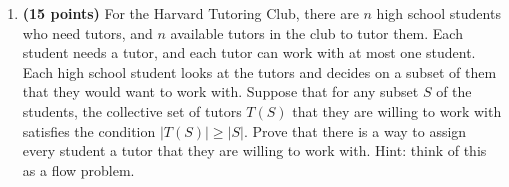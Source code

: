 \documentclass[11pt]{article}
\begin{document}
\begin{enumerate}
\item
{\bf (15 points)}
For the Harvard Tutoring Club, there are $n$ high school students who need tutors,
and $n$ available tutors in the club to tutor them.  Each student needs a tutor,
and each tutor can work with at most one student.
Each high school student looks at the tutors and decides on a subset of them that they
would want to work with.  Suppose that for any subset $S$ of the students, the collective set of 
tutors $T(S)$ that they are willing to work with satisfies the condition $|T(S)| \geq |S|$. 
Prove that there is a way to assign every student a tutor that they are willing to work with.  
Hint:  think of this as a flow problem.  

\end{enumerate}
\end{document}
